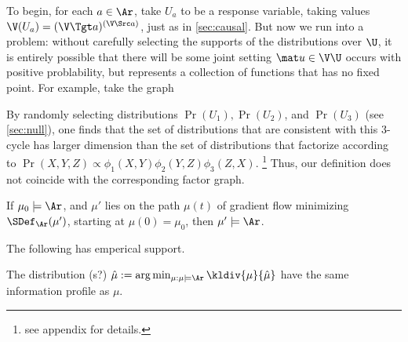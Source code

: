 \begin{subappendices}
{%

To begin, for each $a \in \Ar$, take $U_a$ to be a response variable,
taking values $\V(U_a) = (\V \Tgt a) ^{(\V \Src a)}$, just 
as in \cref{sec:causal}.
But now we run into a problem: without carefully selecting the
supports of the distributions over $\U$, it is entirely possible
that there will be some joint setting $\mat u \in \V \U$
occurs with positive problability, but represents a collection
    of functions that has no fixed point.  
For example, take the graph 


\begin{example}[5, continued]
    By randomly selecting distributions $\Pr(U_1),
    \Pr(U_2)$, and $\Pr(U_3)$ (see \cref{sec:null}), one finds that the set of distributions that are consistent with this 3-cycle has larger dimension than the set of distributions that factorize according to $\Pr(X,Y,Z) \propto \phi_1(X,Y) \phi_2(Y,Z) \phi_3(Z,X)$.%
        \footnote{see appendix for details.}
    Thus, our definition does not coincide with the corresponding factor graph.
\end{example}


\begin{conj}
    If $\mu_0 \models \Ar$, and $\mu'$ lies on the path $\mu(t)$ of
    gradient flow minimizing $\SDef_{\Ar}(\mu')$, starting at $\mu(0) = \mu_0$, then $\mu' \models \Ar$.
\end{conj}

The following has emperical support.

\begin{conj}
    The distribution (s?)
    $\hat \mu := \arg\min_{\mu : \mu \models \Ar} \kldiv{\mu}{\hat\mu}$
    have the same information profile as $\mu$. 
\end{conj}



}
\end{subappendices}
